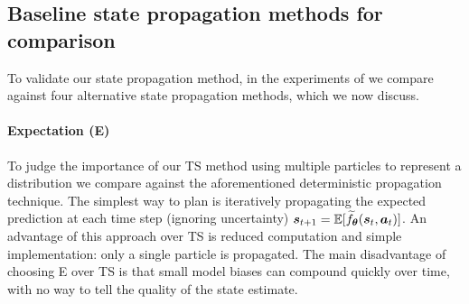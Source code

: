 \subsecspacepre
\subsection{Baseline state propagation methods for comparison}
\label{sec:propagation-baselines}
\subsecspacepost

    To validate our state propagation method, in the experiments of  we compare against four alternative state propagation methods, which we now discuss. 
    
\vspace{-5pt}

	\paragraph{Expectation (E)}
To judge the importance of our TS method using multiple particles to represent a distribution we compare against the aforementioned deterministic propagation technique. 
The simplest way to plan is iteratively propagating the expected prediction at each time step (ignoring uncertainty) $ \boldsymbol{s}_{t+1} = \mathbb{E}[\widetilde{f}_{\boldsymbol{\theta}}(\boldsymbol{s}_{t}, \boldsymbol{a}_{t})]$.
		An advantage of this approach over TS is reduced computation and simple implementation: only a single particle is propagated.
		The main disadvantage of choosing E over TS is that small model biases can compound quickly over time, with no way to tell the quality of the state estimate.
	    

